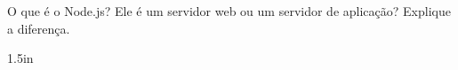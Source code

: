\documentclass[12pt]{exam}
\begin{document}
\begin{questions}
\question O que é o Node.js? Ele é um servidor web ou um servidor de aplicação? Explique a diferença.

\begin{solutionbox}{1.5in} \end{solutionbox}

%

%

%

\end{questions}
\end{document}
